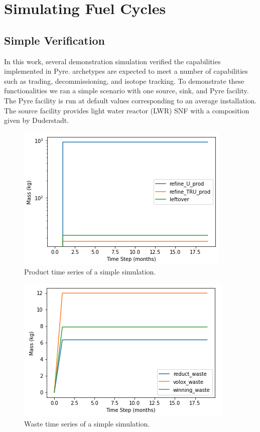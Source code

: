 \chapter[Simulating Fuel Cycles]{Simulating Fuel Cycles}
\section{Simple Verification}
In this work, several demonstration simulation verified the capabilities implemented in Pyre. \Cyclus archetypes are expected to meet a number of capabilities such as trading, decommissioning, and isotope tracking.
To demonstrate these functionalities we ran a simple scenario with one source, sink, and Pyre facility. The Pyre facility is run at default values 
corresponding to an average installation. The source facility provides light water reactor (LWR) SNF with a composition given by Duderstadt. 

\FloatBarrier

\begin{figure} [h]
	\centering
	\includegraphics[width=0.65\linewidth]{images/timeseries-prod}
	\caption{Product time series of a simple simulation.}
	\label{fig:timeseries-prod}
\end{figure}



\begin{figure} [h]
	\centering
	\includegraphics[width=0.65\linewidth]{images/timeseries-waste}
	\caption{Waste time series of a simple simulation.}
	\label{fig:timeseries-waste}
\end{figure}


